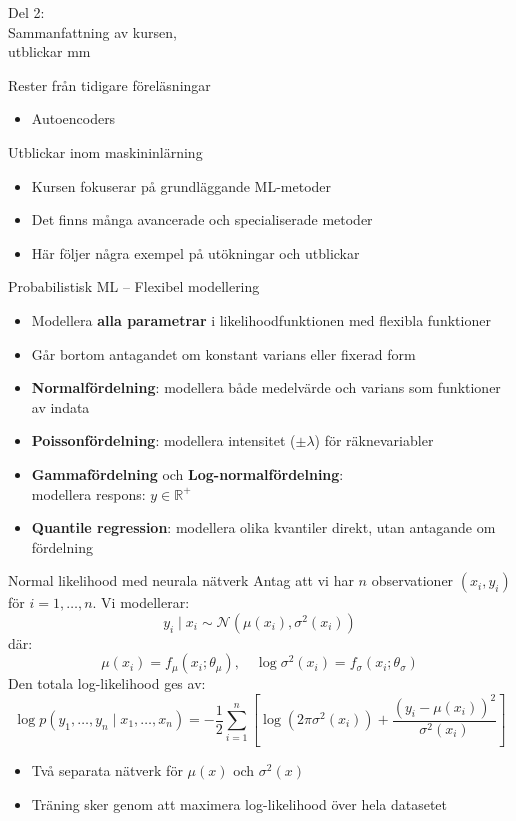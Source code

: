 \documentclass[10pt,english]{beamer}
\begin{document}
\begin{frame}[standout]
    \LARGE Del 2: \\ Sammanfattning av kursen, \\ utblickar mm
\end{frame}


\begin{frame}{Rester från tidigare föreläsningar}
\begin{itemize}
    \item Autoencoders
\end{itemize}
\end{frame}

\begin{frame}{Utblickar inom maskininlärning}
  \begin{itemize}
    \item Kursen fokuserar på grundläggande ML-metoder
    \item Det finns många avancerade och specialiserade metoder
    \item Här följer några exempel på utökningar och utblickar
  \end{itemize}
\end{frame}

\begin{frame}{Probabilistisk ML – Flexibel modellering}
  \begin{itemize}
    \item Modellera \textbf{alla parametrar} i likelihoodfunktionen med flexibla funktioner
    \item Går bortom antagandet om konstant varians eller fixerad form
    \item \textbf{Normalfördelning}: modellera både medelvärde och varians som funktioner av indata
    \item \textbf{Poissonfördelning}: modellera intensitet ($±\lambda$) för räknevariabler
    \item \textbf{Gammafördelning} och \textbf{Log-normalfördelning}: \\ modellera respons: $y\in \mathbb{R}^+$
    \item \textbf{Quantile regression}: modellera olika kvantiler direkt, utan antagande om fördelning
  \end{itemize}
\end{frame}


\begin{frame}{Normal likelihood med neurala nätverk}
  Antag att vi har $n$ observationer $(x_i, y_i)$ för $i = 1, \dots, n$. Vi modellerar:
  \[
  y_i \mid x_i \sim \mathcal{N}(\mu(x_i), \sigma^2(x_i))
  \]
  där:
  \[
  \mu(x_i) = f_\mu(x_i; \theta_\mu), \quad \log \sigma^2(x_i) = f_\sigma(x_i; \theta_\sigma)
  \]
  Den totala log-likelihood ges av:
  \[
  \log p(y_1, \dots, y_n \mid x_1, \dots, x_n) = 
  -\frac{1}{2} \sum_{i=1}^n \left[ \log(2\pi \sigma^2(x_i)) + \frac{(y_i - \mu(x_i))^2}{\sigma^2(x_i)} \right]
  \]
  \begin{itemize}
    \item Två separata nätverk för $\mu(x)$ och $\sigma^2(x)$
    \item Träning sker genom att maximera log-likelihood över hela datasetet
  \end{itemize}
\end{frame}
\end{document}
